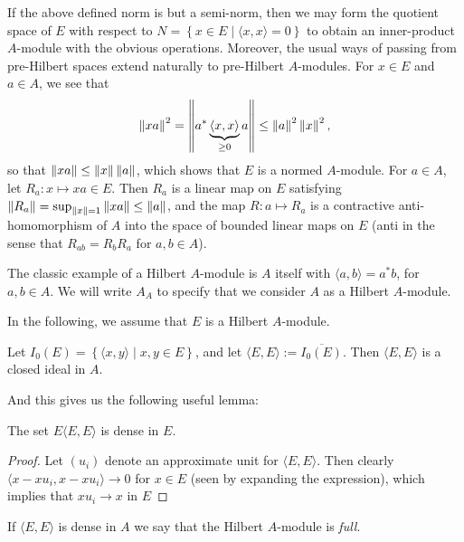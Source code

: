 If the above defined norm is but a semi-norm, then we may form the quotient space of $E$ with respect to $N=\left\{ x \in E \mid \langle x , x \rangle = 0 \right\}$ to obtain an inner-product $A$-module with the obvious operations. Moreover, the usual ways of passing from pre-Hilbert spaces extend naturally to pre-Hilbert $A$-modules. For $x \in E$ and $a \in A$, we see that
\begin{align*}
	\left\lVert x a \right\rVert^2 = \left\lVert a^* \underbrace{\langle x, x \rangle}_{\geq 0} a \right\rVert \leq \left\lVert a \right\rVert^2 \left\lVert x \right\rVert^2,
\end{align*}
so that $\left\lVert x a \right\rVert \leq \left\lVert x \right\rVert \left\lVert a \right\rVert$, which shows that $E$ is a normed $A$-module. For $a \in A$, let $R_a \colon x \mapsto xa \in E$. Then $R_a$ is a linear map on $E$ satisfying $\left\lVert R_a\right\rVert = \sup_{\left\lVert x \right\rVert = 1} \left\lVert xa \right\rVert \leq \left\lVert a \right\rVert$, and the map $R \colon a \mapsto R_a$ is a contractive anti-homomorphism of $A$ into the space of bounded linear maps on $E$ (anti in the sense that $R_{ab}=R_bR_a$ for $a,b \in A$).




\begin{example}
	The classic example of a Hilbert $A$-module is $A$ itself with $\langle a,b \rangle = a^*b$, for $a,b \in A$. We will write $A_A$ to specify that we consider $A$ as a Hilbert $A$-module.
\end{example}

In the following, we assume that $E$ is a Hilbert $A$-module.
\begin{remark}
	Let $I_0(E) = \left\{ \langle x,y \rangle \mid x,y \in E \right\}$, and let $\langle E,E \rangle := \overline{I_0(E)}$. Then $\langle E,E \rangle$ is a closed ideal in $A$. 
\end{remark}
And this gives us the following useful lemma:
\begin{lemma}
	The set $E\langle E,E\rangle$ is dense in $E$.
	\label{EEEdense}
\end{lemma}
\begin{proof}
	Let $(u_i)$ denote an approximate unit for $\langle E,E \rangle$. Then clearly $\langle x-x u_i , x-x u_i\rangle \to 0$ for $x \in E$ (seen by expanding the expression), which implies that $x u_i \to x$ in $E$
\end{proof}
\begin{definition}
	If $\langle E,E \rangle$ is dense in $A$ we say that the Hilbert $A$-module is \emph{full}.
\end{definition}

